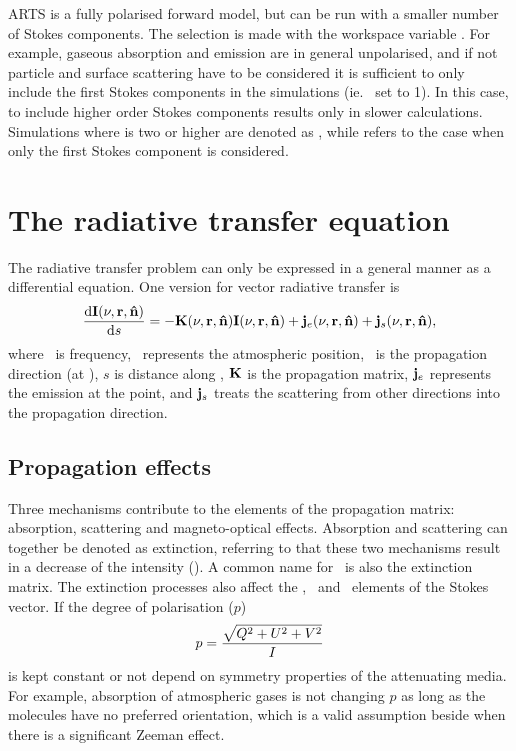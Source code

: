 ARTS is a fully polarised forward model, but can be run with a smaller number
of Stokes components. The selection is made with the workspace variable
. For example, gaseous absorption and emission are in
general unpolarised, and if not particle and surface scattering have to be
considered it is sufficient to only include the first Stokes components in the
simulations (ie.\  set to 1). In this case, to include
higher order Stokes components results only in slower calculations. Simulations
where  is two or higher are denoted as
, while  refers to the case when only the first Stokes component is
considered.
 



\section{The radiative transfer equation}
\label{sec:rteq}

The radiative transfer problem can only be expressed in a general manner as a
differential equation. One version for vector radiative transfer is
\begin{equation}
  \label{eq:VRTE0}
  \frac {\mathrm{d}{\bf I}(\nu,{\bf r},{\bf \hat{n}})}{\mathrm{d} s} =
    -{\bf K}(\nu,{\bf r},{\bf \hat{n}}) {\bf I}(\nu,{\bf r},{\bf \hat{n}}) +
    \mathbf{j}_e(\nu,{\bf r},{\bf \hat{n}}) + \mathbf{j}_s(\nu,{\bf r},{\bf \hat{n}}),  
\end{equation}
where \Frq\ is frequency, \PPos\ represents the atmospheric position, \PDir\ is
the propagation direction (at \PPos), $s$ is distance along \PDir, ${\bf K}$ is
the propagation matrix, $\mathbf{j}_e$ represents the emission at the point,
and $\mathbf{j}_s$ treats the scattering from other directions into the
propagation direction.






\subsection{Propagation effects}
\label{sec:rteq:propmat}

Three mechanisms contribute to the elements of the propagation matrix:
absorption, scattering and magneto-optical effects. Absorption and scattering
can together be denoted as extinction, referring to that these two mechanisms
result in a decrease of the intensity (\StoI). A common name for \ExtMat\ is
also the extinction matrix. The extinction processes also affect the \StoQ,
\StoU\ and \StoV\ elements of the Stokes vector. If the degree of polarisation
($p$)
\begin{equation}
  \label{eq:degreeofpol}
  p = \frac{\sqrt{Q^2+U^2+V^2}}{I}
\end{equation}
is kept constant or not depend on symmetry properties of the attenuating media.
For example, absorption of atmospheric gases is not changing $p$ as long as the
molecules have no preferred orientation, which is a valid assumption beside
when there is a significant Zeeman effect.

